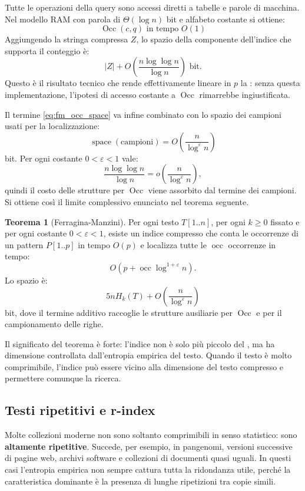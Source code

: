 \documentclass{article}
\theoremstyle{definition}
\newtheorem{theorem}{Teorema}[section] %
\numberwithin{equation}{section}
\begin{document}
Tutte le operazioni della query sono accessi diretti a tabelle e parole di macchina. Nel modello RAM con parola di $\Theta(\log n)$ bit e alfabeto costante si ottiene:
\[
    \operatorname{Occ}(c,q)\text{ in tempo }O(1)
\]
Aggiungendo la stringa compressa $Z$, lo spazio della componente dell'indice che supporta il conteggio è:
\begin{equation}\label{eq:fm_occ_space}
    |Z|
    +
    O\!\left(\frac{n\log\log n}{\log n}\right)
    \text{ bit}.
\end{equation}
Questo è il risultato tecnico che rende effettivamente lineare in $p$ la : senza questa implementazione, l'ipotesi di accesso costante a $\operatorname{Occ}$ rimarrebbe ingiustificata.

Il termine \eqref{eq:fm_occ_space} va infine combinato con lo spazio dei campioni usati per la localizzazione:
\[
    \operatorname{space}(\text{campioni})
    =
    O\!\left(\frac{n}{\log^\varepsilon n}\right)
\]
bit. Per ogni costante $0<\varepsilon<1$ vale:
\[
    \frac{n\log\log n}{\log n}
    =
    o\!\left(\frac{n}{\log^\varepsilon n}\right),
\]
quindi il costo delle strutture per $\operatorname{Occ}$ viene assorbito dal termine dei campioni. Si ottiene così il limite complessivo enunciato nel teorema seguente.

\begin{theorem}[Ferragina-Manzini]
    Per ogni testo $T[1..n]$, per ogni $k\geq 0$ fissato e per ogni costante $0<\varepsilon<1$, esiste un indice compresso che conta le occorrenze di un pattern $P[1..p]$ in tempo $O(p)$ e localizza tutte le $\operatorname{occ}$ occorrenze in tempo:
    \[
        O\!\left(p+\operatorname{occ}\log^{1+\varepsilon}n\right).
    \]
    Lo spazio è:
    \[
        5nH_k(T)+O\!\left(\frac{n}{\log^\varepsilon n}\right)
    \]
    bit, dove il termine additivo raccoglie le strutture ausiliarie per $\operatorname{Occ}$ e per il campionamento delle righe.
\end{theorem}

Il significato del teorema è forte: l'indice non è solo più piccolo del , ma ha dimensione controllata dall'entropia empirica del testo. Quando il testo è molto comprimibile, l'indice può essere vicino alla dimensione del testo compresso e permettere comunque la ricerca.

\subsection{Testi ripetitivi e r-index}
Molte collezioni moderne non sono soltanto comprimibili in senso statistico: sono \textbf{altamente ripetitive}. Succede, per esempio, in pangenomi, versioni successive di pagine web, archivi software e collezioni di documenti quasi uguali. In questi casi l'entropia empirica non sempre cattura tutta la ridondanza utile, perché la caratteristica dominante è la presenza di lunghe ripetizioni tra copie simili.
\end{document}

